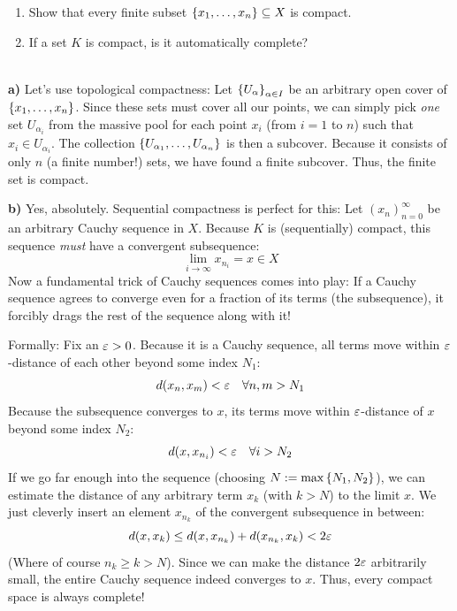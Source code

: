 \vspace{0.5cm}

\begin{exercises}
\begin{enumerate}
    \item Show that every finite subset $\left\{ x_1, \dots, x_n \right\} \subseteq X$ is compact.
    \item If a set $K$ is compact, is it automatically complete?
\end{enumerate}
\end{exercises}

\begin{solution}\hfill\\ 
\textbf{a)} Let's use topological compactness: Let $\left\{ U_\alpha \right\}_{\alpha \in I}$ be an arbitrary open cover of $\left\{ x_1, \dots, x_n \right\}$. Since these sets must cover all our points, we can simply pick \emph{one} set $U_{\alpha_i}$ from the massive pool for each point $x_i$ (from $i=1$ to $n$) such that $x_i \in U_{\alpha_i}$. 
The collection $\left\{ U_{\alpha_1}, \dots, U_{\alpha_n} \right\}$ is then a subcover. Because it consists of only $n$ (a finite number!) sets, we have found a finite subcover. Thus, the finite set is compact.

\vspace{0.3cm}
\textbf{b)} \textcolor{eDarkGreen}{Yes, absolutely.} Sequential compactness is perfect for this: Let $(x_n)_{n=0}^\infty$ be an arbitrary Cauchy sequence in $X$. Because $K$ is (sequentially) compact, this sequence \emph{must} have a convergent subsequence:
\[ \lim_{i \to \infty} x_{n_i} = x \in X \]
Now a fundamental trick of Cauchy sequences comes into play: If a Cauchy sequence agrees to converge even for a fraction of its terms (the subsequence), it forcibly drags the rest of the sequence along with it!

Formally: Fix an $\varepsilon > 0$. Because it is a Cauchy sequence, all terms move within $\varepsilon$-distance of each other beyond some index $N_1$:
\[ d(x_n, x_m) < \varepsilon \quad \forall n, m > N_1 \]
Because the subsequence converges to $x$, its terms move within $\varepsilon$-distance of $x$ beyond some index $N_2$:
\[ d(x, x_{n_i}) < \varepsilon \quad \forall i > N_2 \]
If we go far enough into the sequence (choosing $N := \max\left\{ N_1, N_2 \right\}$), we can estimate the distance of any arbitrary term $x_k$ (with $k > N$) to the limit $x$. We just cleverly insert an element $x_{n_k}$ of the convergent subsequence in between:
\[ d(x, x_k) \le d(x, x_{n_k}) + d(x_{n_k}, x_k) < 2\varepsilon \]
\textcolor{eGray}{(Where of course $n_k \ge k > N$).} Since we can make the distance $2\varepsilon$ arbitrarily small, the entire Cauchy sequence indeed converges to $x$. Thus, every compact space is always complete!
\end{solution}